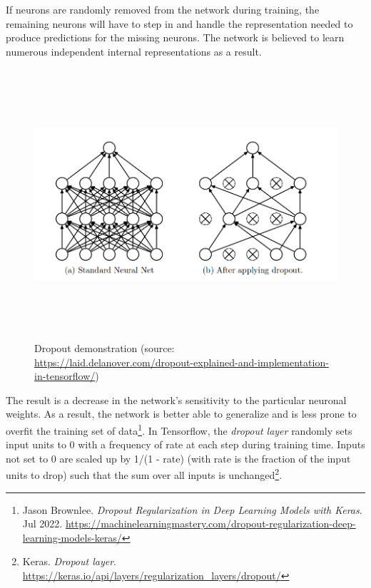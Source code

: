 If neurons are randomly removed from the network during training, the remaining neurons will have to step in and handle the representation needed to produce predictions for the missing neurons. The network is believed to learn numerous independent internal representations as a result.
\begin{figure}[!h]
	\centering
	\includegraphics[width=\linewidth, height=10cm,keepaspectratio]{figures/dropout.png}
   \caption{Dropout demonstration (source: \url{https://laid.delanover.com/dropout-explained-and-implementation-in-tensorflow/})}
\end{figure}

The result is a decrease in the network's sensitivity to the particular neuronal weights. As a result, the network is better able to generalize and is less prone to overfit the training set of data\footnote{
	Jason Brownlee. \textit{Dropout Regularization in Deep Learning Models with Keras}. Jul 2022. \url{https://machinelearningmastery.com/dropout-regularization-deep-learning-models-keras/}
}.
In Tensorflow, the \emph{dropout layer} randomly sets input units to 0 with a frequency of rate
at each step during training time. Inputs not set to 0 are scaled up by 1/(1 - rate)  (with rate is the fraction of the input units to drop) such that the sum over all inputs is unchanged\footnote{Keras. \textit{Dropout layer}. \url{https://keras.io/api/layers/regularization_layers/dropout/}}.
